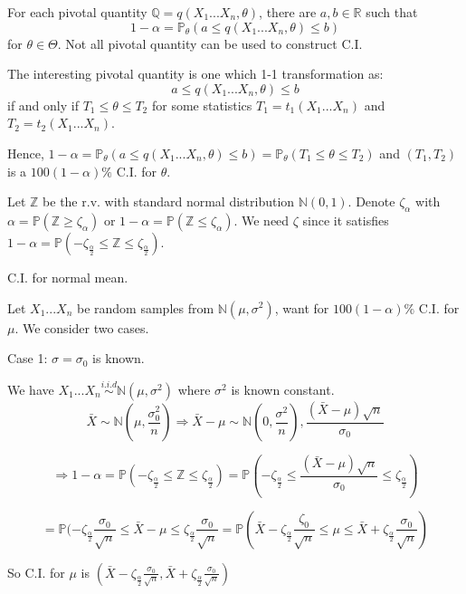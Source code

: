\documentclass[a4paper,12pt]{article}
\begin{document}
For each pivotal quantity $\mathbb{Q} = q( X_1...X_n, \theta)$, 
there are $a, b \in \mathbb{R}$ such that $$ 1-\alpha = \mathbb{P}_\theta (a \leq q( X_1... X_n, \theta) \leq b)$$ for $\theta \in \Theta$. Not all pivotal quantity can be used to construct C.I.
 
The interesting pivotal quantity is one which 1-1 transformation as:
 $$a \leq q(X_1 ... X_n, \theta) \leq b$$ if and only if $T_1 \leq \theta \leq T_2$ 
 for some statistics $T_1 = t_1 (X_1 ... X_n)$ and $T_2 = t_2 (X_1 ... X_n)$.

Hence, $1 -\alpha = \mathbb{P}_\theta (a \leq q(X_1 ... X_n, \theta) \leq b) = \mathbb{P}_\theta (T_1 \leq \theta \leq T_2)$ and $(T_1, T_2)$ is a $100(1-\alpha)\%$ C.I. for $\theta$.

Let $\mathbb{Z}$ be the r.v. with standard normal distribution $\mathbb{N}(0,1)$.
Denote $\zeta_\alpha$ with $\alpha = \mathbb{P}(\mathbb{Z} \geq \zeta_\alpha)$ 
or $1-\alpha = \mathbb{P}(\mathbb{Z} \leq \zeta_\alpha)$. 
We need $\zeta$ since it satisfies $1-\alpha = \mathbb{P}(-\zeta_{\frac{\alpha}{2}}\leq \mathbb{Z} \leq \zeta_{\frac{\alpha}{2}})$.

C.I. for normal mean.

Let $X_1 ... X_n$ be random samples from $\mathbb{N}(\mu,\sigma^2)$, 
want for $100(1-\alpha)\%$ C.I. for $\mu$. We consider two cases.

Case 1: $\sigma = \sigma_0$ is known.

We have $X_1 ... X_n \overset{i.i.d}{\sim} \mathbb{N}(\mu, \sigma^2)$ where $\sigma^2$ is known constant.
$$\bar{X} \sim \mathbb{N}(\mu, \frac{\sigma_0^2}{n}) \Rightarrow 
\bar{X} - \mu \sim \mathbb{N}(0, \frac{\sigma^2}{n}), 
\frac{(\bar{X} - \mu) \sqrt{n}}{\sigma_0} $$

$$\Rightarrow 1-\alpha = \mathbb{P}(-\zeta_{\frac{\alpha}{2}} \leq \mathbb{Z} \leq \zeta_{\frac{\alpha}{2}})
= \mathbb{P}(-\zeta_{\frac{\alpha}{2}} \leq \frac{(\bar{X} - \mu) \sqrt{n}}{\sigma_0} \leq \zeta_{\frac{\alpha}{2}})$$


$$= \mathbb{P} (-\zeta_{\frac{\alpha}{2}} \frac{\sigma_0}{\sqrt{n}} \leq \bar{X} - \mu \leq \zeta_{\frac{\alpha}{2}} \frac{\sigma_0}{\sqrt{n}}
= \mathbb{P}(\bar{X} - \zeta_{\frac{\alpha}{2}} \frac{\zeta_0}{\sqrt{n}}
\leq \mu \leq \bar{X} + \zeta_{\frac{\alpha}{2}} \frac{\sigma_0}{\sqrt{n}})$$

So C.I. for $\mu$ is $(\bar{X}- \zeta_{\frac{\alpha}{2}} \frac{\sigma_0}{\sqrt{n}},
\bar{X} + \zeta_{\frac{\alpha}{2}} \frac{\sigma_0}{\sqrt{n}})$
\end{document}
